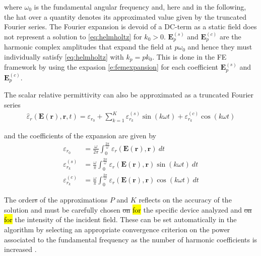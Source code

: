 \documentclass[journal]{IEEEtran}
\renewcommand{\vec}[1]{\mathbf{#1}}
\begin{document}
\noindent where $\omega_0$ is the fundamental angular frequency and, here and in
the following, the hat over a quantity denotes its approximated value given by
the truncated Fourier series. The Fourier expansion is devoid of a DC-term as a
static field does not represent a solution to \eqref{eq:helmholtz} for $k_0 >
0$. $\vec{E}_{p}^{(s)}$ and $\vec{E}_{p}^{(c)}$ are the harmonic complex
amplitudes that expand the field at $p\omega_0$ and hence they must individually
satisfy \eqref{eq:helmholtz} with $k_p=pk_0$. This is done in the FE framework
by using the expasion \eqref{e:femexpansion} for each coefficient $\vec{E}_{p}^{(s)}$ and
$\vec{E}_{p}^{(c)}$.

The scalar relative permittivity can also be approximated as a truncated Fourier series 
%
\begin{eqnarray} \label{eq:eps}
\hat{{\varepsilon}}_r(\vec{E}(\vec{r}), \vec{r}, t) = {\varepsilon}_{r_0} + \sum^K_{k=1} 
{\varepsilon}_{r_k}^{(s)} \sin(k \omega t) + {\varepsilon}_{r_k}^{(c)} \cos(k \omega t)
\end{eqnarray} 

\noindent and the coefficients of the expansion are given by
\begin{align} \label{eq:epsCoeffs}
{\varepsilon}_{r_{0}} &=  \frac{\omega}{2\pi}\int_0^{\frac{2\pi}{\omega}}
{\varepsilon}_r(\vec{E}(\vec{r}), \vec{r}) \ dt \nonumber \\
{\varepsilon}_{r_{k}}^{(s)} &=  \frac{\omega}{\pi}\int_0^{\frac{2\pi}{\omega}}
{\varepsilon}_r(\vec{E}(\vec{r}), \vec{r}) \sin(k \omega t) \ dt \\ 
{\varepsilon}_{r_{k}}^{(c)} &=  \frac{\omega}{\pi}\int_0^{\frac{2\pi}{\omega}} 
{\varepsilon}_r(\vec{E}(\vec{r}), \vec{r}) \cos(k \omega t) \ dt
\nonumber 
\end{align} 

The order\st{s} of the approximations $P$ and $K$ reflects on the accuracy
of the solution and must be carefully chosen \st{on} \hl{for} the specific device
analyzed and \st{on} \hl{for} the intensity of the incident field. These can be set
automatically in the algorithm by selecting an appropriate convergence criterion
on the power associated to the fundamental frequency as the number of harmonic
coefficients is increased \cite{Gyselinck2002}.
\end{document}
